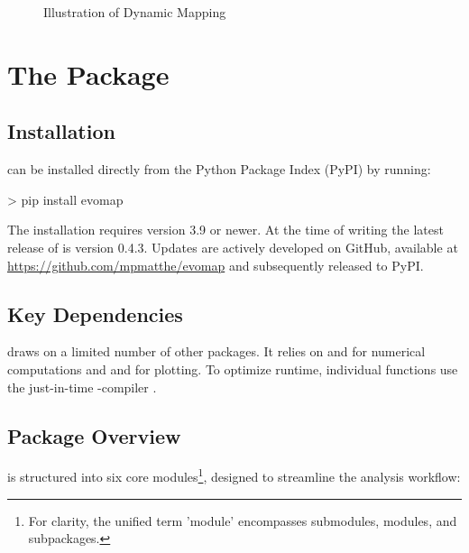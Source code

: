 \documentclass[article]{jss}
\begin{document}
\begin{figure}
  \centering
  \caption{\label{fig:dynamic-map-illustration} Illustration of Dynamic Mapping}
\end{figure}

\section[The evomap Package]{The  Package} \label{sec:package}

\subsection{Installation}

 can be installed directly from the Python Package Index (PyPI) by running:

\begin{CodeChunk}
  \begin{CodeInput}
  > pip install evomap
  \end{CodeInput}
\end{CodeChunk}

The installation requires  version 3.9 or newer. 
At the time of writing the latest release of  is version 0.4.3. Updates are actively developed on GitHub, 
available at \href{https://github.com/mpmatthe/evomap}{https://github.com/mpmatthe/evomap} and subsequently released to PyPI.

\subsection{Key Dependencies}

 draws on a limited number of other packages. It relies on  and  for 
numerical computations and  and  for plotting. To optimize runtime, individual functions 
use the just-in-time -compiler .

\subsection{Package Overview}

 is structured into six core modules\footnote{For clarity, the unified term 'module' encompasses 
submodules, modules, and subpackages.}, designed to streamline the analysis workflow:
\end{document}
